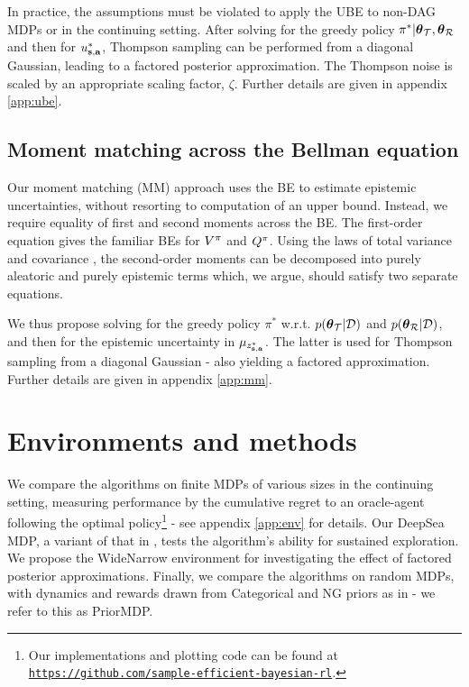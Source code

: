 \documentclass{article}
\begin{document}
In practice, the assumptions must be violated to apply the UBE to non-DAG MDPs or in the continuing setting. After solving for the greedy policy ${\pi^*} | \boldsymbol{\theta}_{\mathcal{T}}, \boldsymbol{\theta}_{\mathcal{R}}$ and then for $u_{\mathbf{s}, \mathbf{a}}^{*}$, Thompson sampling can be performed from a diagonal Gaussian, leading to a factored posterior approximation. The Thompson noise is scaled by an appropriate scaling factor, $\zeta$. Further details are given in appendix \ref{app:ube}.

\subsection{Moment matching across the Bellman equation}

Our moment matching (MM) approach uses the BE to estimate epistemic uncertainties, without resorting to computation of an upper bound. Instead, we require equality of first and second moments across the BE. The first-order equation gives the familiar BEs for $V^{\pi}$ and $Q^{\pi}$. Using the laws of total variance and covariance \citep{weiss}, the second-order moments can be decomposed into purely aleatoric and purely epistemic terms which, we argue, should satisfy two separate equations.

We thus propose solving for the greedy policy $\pi^*$ w.r.t. $p(\boldsymbol{\theta}_{\mathcal{T}} | \mathcal{D})$ and $p(\boldsymbol{\theta}_{\mathcal{R}} | \mathcal{D})$, and then for the epistemic uncertainty in $\mu_{z^*_{\mathbf{s}, \mathbf{a}}}$. The latter is used for Thompson sampling from a diagonal Gaussian - also yielding a factored approximation. Further details are given in appendix \ref{app:mm}.

\section{Environments and methods}

We compare the algorithms on finite MDPs of various sizes in the continuing setting, measuring performance by the cumulative regret to an oracle-agent following the optimal policy\footnote{Our implementations and plotting code can be found at \scriptsize{\texttt{\href{https://github.com/sample-efficient-bayesian-rl/nips-2019-rl-workshop}{https://github.com/sample-efficient-bayesian-rl}}}.} - see appendix \ref{app:env} for details. Our DeepSea MDP, a variant of that in \cite{deepsea}, tests the algorithm's ability for sustained exploration. We propose the WideNarrow environment for investigating the effect of factored posterior approximations. Finally, we compare the algorithms on random MDPs, with dynamics and rewards drawn from Categorical and NG priors as in \cite{psrl} - we refer to this as PriorMDP.
\end{document}
